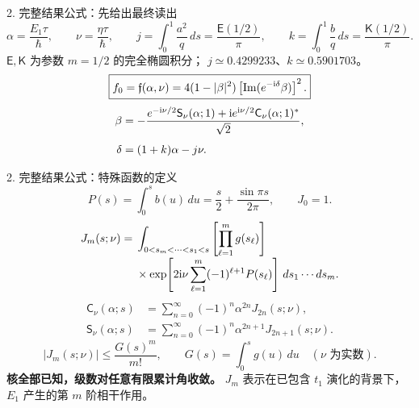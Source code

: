 \documentclass[aspectratio=169,11pt]{beamer}
\begin{document}
\begin{frame}[t]{2. 完整结果公式：先给出最终读出}
  \small
  \[
    \alpha=\frac{E_1\tau}{\hbar},\qquad \nu=\frac{\eta\tau}{\hbar},\qquad
    j=\int_0^1\frac{a^2}{q}\,ds=\frac{\mathsf E(1/2)}\pi,\qquad
    k=\int_0^1\frac bq\,ds=\frac{\mathsf K(1/2)}\pi.
  \]
  $\mathsf E,\mathsf K$ 为参数 $m=1/2$ 的完全椭圆积分；
  $j\simeq0.4299233$、$k\simeq0.5901703$。
  \vspace{.15cm}
  \[
    \boxed{f_0=\mathfrak f(\alpha,\nu)
       =4(1-|\beta|^2)\left[\operatorname{Im}(e^{-\mathrm{i}\delta}\beta)\right]^2.}
  \]
  \[
  \begin{aligned}
    \beta&=-\frac{e^{-\mathrm{i}\nu/2}\mathsf S_\nu(\alpha;1)
                  +\mathrm{i} e^{\mathrm{i}\nu/2}\mathsf C_\nu(\alpha;1)^*}{\sqrt2},\\[.15cm]
    \delta&=(1+k)\alpha-j\nu.
  \end{aligned}
  \]
  \vspace{.15cm}
\end{frame}

\begin{frame}[t]{2. 完整结果公式：特殊函数的定义}
  \small
  \setlength{\abovedisplayskip}{5pt}\setlength{\belowdisplayskip}{5pt}
  \setlength{\abovedisplayshortskip}{3pt}\setlength{\belowdisplayshortskip}{3pt}
  \[
    P(s)=\int_0^s b(u)\,du=\frac s2+\frac{\sin\pi s}{2\pi},\qquad J_0=1.
  \]
  \[
  \begin{aligned}
    J_m(s;\nu)={}&\int_{0<s_m<\cdots<s_1<s}
       \left[\prod_{\ell=1}^m g(s_\ell)\right]\\[-.1cm]
       &\times\exp\!\left[2\mathrm{i}\nu\sum_{\ell=1}^m(-1)^{\ell+1}P(s_\ell)\right]
          \,ds_1\cdots ds_m.
  \end{aligned}
  \]
  \[
  \begin{aligned}
    \mathsf C_\nu(\alpha;s)&=\sum_{n=0}^\infty(-1)^n\alpha^{2n}J_{2n}(s;\nu),\\
    \mathsf S_\nu(\alpha;s)&=\sum_{n=0}^\infty(-1)^n\alpha^{2n+1}J_{2n+1}(s;\nu).
  \end{aligned}
  \]
  \[
    |J_m(s;\nu)|\le\frac{G(s)^m}{m!},\qquad G(s)=\int_0^s g(u)\,du
    \quad(\nu\text{ 为实数}).
  \]
  \textbf{核全部已知，级数对任意有限累计角收敛。}
  $J_m$ 表示在已包含 $t_1$ 演化的背景下，$E_1$ 产生的第 $m$ 阶相干作用。
\end{frame}
\end{document}
